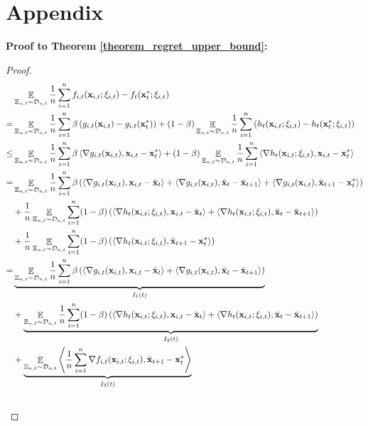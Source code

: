 \documentclass{article}
\begin{document}
\section*{Appendix}

\textbf{Proof to Theorem \ref{theorem_regret_upper_bound}:}
\begin{proof}
\begin{align}
\nonumber
& \mathop{\mathbb{E}}_{ \Xi_{n,t} \sim \mathcal{D}_{n,t} } \frac{1}{n}\sum_{i=1}^n f_{i,t}({\bf x}_{i,t};\xi_{i,t}) - f_t({\bf x}_t^\ast;\xi_{i,t}) \\ \nonumber
=& \mathop{\mathbb{E}}_{ \Xi_{n,t} \sim \mathcal{D}_{n,t} }\frac{1}{n}\sum_{i=1}^n \beta \left( g_{i,t}({\bf x}_{i,t}) - g_{i,t}({\bf x}_t^\ast) \right) + (1-\beta) \mathop{\mathbb{E}}_{ \Xi_{n,t} \sim \mathcal{D}_{n,t} }\frac{1}{n}\sum_{i=1}^n \left( h_t({\bf x}_{i,t};\xi_{i,t}) - h_t({\bf x}_t^\ast;\xi_{i,t}) \right) \\ \nonumber
\le & \mathop{\mathbb{E}}_{ \Xi_{n,t} \sim \mathcal{D}_{n,t} }\frac{1}{n}\sum_{i=1}^n \beta \left\langle\nabla g_{i,t}({\bf x}_{i,t}), {\bf x}_{i,t} - {\bf x}_t^\ast  \right\rangle + (1-\beta) \mathop{\mathbb{E}}_{ \Xi_{n,t} \sim \mathcal{D}_{n,t} } \frac{1}{n}\sum_{i=1}^n \left\langle\nabla h_t({\bf x}_{i,t};\xi_{i,t}), {\bf x}_{i,t} - {\bf x}_t^\ast  \right\rangle \\ \nonumber
 = & \mathop{\mathbb{E}}_{ \Xi_{n,t} \sim \mathcal{D}_{n,t} }\frac{1}{n}\sum_{i=1}^n \beta \left( \left\langle\nabla g_{i,t}({\bf x}_{i,t}), {\bf x}_{i,t} - \bar{{\bf x}}_t  \right\rangle + \left\langle\nabla g_{i,t}({\bf x}_{i,t}), \bar{{\bf x}}_t - \bar{{\bf x}}_{t+1} \right\rangle + \left\langle\nabla g_{i,t}({\bf x}_{i,t}), \bar{{\bf x}}_{t+1} - {\bf x}_t^\ast   \right\rangle  \right) \\ \nonumber 
 & + \frac{1}{n}\mathop{\mathbb{E}}_{ \Xi_{n,t} \sim \mathcal{D}_{n,t} }\sum_{i=1}^n (1-\beta) \left(   \left\langle\nabla h_t({\bf x}_{i,t};\xi_{i,t}), {\bf x}_{i,t} - \bar{{\bf x}}_t  \right\rangle +  \left\langle\nabla h_t({\bf x}_{i,t};\xi_{i,t}), \bar{{\bf x}}_t - \bar{{\bf x}}_{t+1}  \right\rangle  \right) \\ \nonumber 
 & + \frac{1}{n}\mathop{\mathbb{E}}_{ \Xi_{n,t} \sim \mathcal{D}_{n,t} }\sum_{i=1}^n (1-\beta) \left(  \left\langle\nabla h_t({\bf x}_{i,t};\xi_{i,t}), \bar{{\bf x}}_{t+1} - {\bf x}_t^\ast  \right\rangle  \right)\\ \nonumber
= & \underbrace{ \mathop{\mathbb{E}}_{ \Xi_{n,t} \sim \mathcal{D}_{n,t} } \frac{1}{n}\sum_{i=1}^n \beta \left( \left\langle\nabla g_{i,t}({\bf x}_{i,t}), {\bf x}_{i,t} - \bar{{\bf x}}_t  \right\rangle + \left\langle\nabla g_{i,t}({\bf x}_{i,t}), \bar{{\bf x}}_t - \bar{{\bf x}}_{t+1}  \right\rangle  \right) }_{I_1(t)} \\ \nonumber 
 & + \underbrace{ \mathop{\mathbb{E}}_{ \Xi_{n,t} \sim \mathcal{D}_{n,t} } \frac{1}{n}\sum_{i=1}^n (1-\beta) \left(  \left\langle\nabla h_t({\bf x}_{i,t}; \xi_{i,t}), {\bf x}_{i,t} - \bar{{\bf x}}_t  \right\rangle +   \left\langle\nabla h_t({\bf x}_{i,t};\xi_{i,t}), \bar{{\bf x}}_t - \bar{{\bf x}}_{t+1}  \right\rangle \right) }_{I_2(t)}\\ \nonumber 
&+ \underbrace{ \mathop{\mathbb{E}}_{ \Xi_{n,t} \sim \mathcal{D}_{n,t} } \left\langle\frac{1}{n}\sum_{i=1}^n\nabla f_{i,t}({\bf x}_{i,t};\xi_{i,t}), \bar{{\bf x}}_{t+1} - {\bf x}_t^\ast  \right\rangle }_{I_3(t)}\\ \nonumber
\end{align}


\end{proof}
\end{document}
